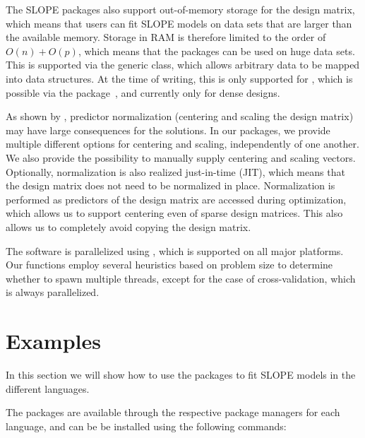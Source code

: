 \documentclass[article]{jss}
\begin{document}
The SLOPE packages also support out-of-memory storage for the design matrix, which
means that users can fit SLOPE models on data sets that are larger than the
available memory. Storage in RAM is therefore limited to the order of \(O(n) +
O(p)\), which means that the packages can be used on huge data sets.
This is supported via the generic  class, which allows
arbitrary data to be mapped into  data structures. At the
time of writing, this is only supported for ,
which is possible via the  package~\citep{kane2013},
and currently only for dense designs.

As shown by \citet{larsson2025}, predictor normalization (centering and
scaling the design matrix) may have large consequences for the
solutions. In our packages, we provide multiple different options
for centering and scaling, independently of one another.
We also provide the possibility to manually supply centering
and scaling vectors. Optionally, normalization is also realized just-in-time (JIT),
which means that the design matrix does not need to be normalized in place.
Normalization is performed as predictors of the design matrix are accessed during
optimization, which allows us to support centering even of sparse design
matrices. This also allows us to completely avoid copying the design matrix.

The software is parallelized using , which is supported on all
major platforms. Our functions employ several heuristics based on problem size to
determine whether to spawn multiple threads, except
for the case of cross-validation, which is always parallelized.

\section{Examples}\label{sec:examples}

In this section we will show how to use the packages to fit SLOPE models in
the different languages.

The packages are
available through the respective package managers for each language, and can be
be installed using the following commands:
\begin{description}[labelwidth=8ex]
  \item[\proglang{R}] 
  \item[\proglang{Python}] 
  \item[\proglang{Julia}] 
\end{description}
\end{document}
